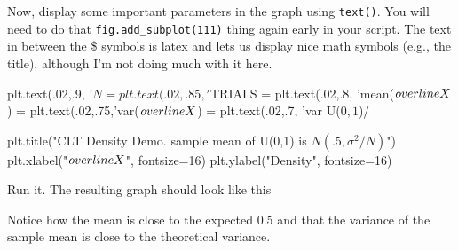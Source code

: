 \begin{fullwidth}
\step Now, display some important parameters in the graph using {\tt text()}. You will need to do that {\tt fig.add\_subplot(111)} thing again early in your script. The text in between the \$ symbols is latex and lets us display nice math symbols (e.g., the title), although I'm not doing much with it here.

{\small
\begin{pyverbatim}
plt.text(.02,.9, '$N = %
plt.text(.02,.85,'$TRIALS = %
plt.text(.02,.8, 'mean($\\overline{X}$) = %
plt.text(.02,.75,'var($\\overline{X}$) = %
plt.text(.02,.7, 'var U($0,1$)/%

plt.title("CLT Density Demo. sample mean of U(0,1) is $N(.5, \sigma^2/N)$")
plt.xlabel("$\\overline{X}$", fontsize=16)
plt.ylabel("Density", fontsize=16)
\end{pyverbatim}
}

\step Run it. The resulting graph should look like this \\


Notice how the mean is close to the expected 0.5 and that the variance of the sample mean is close to the theoretical variance.\\


\end{fullwidth}
